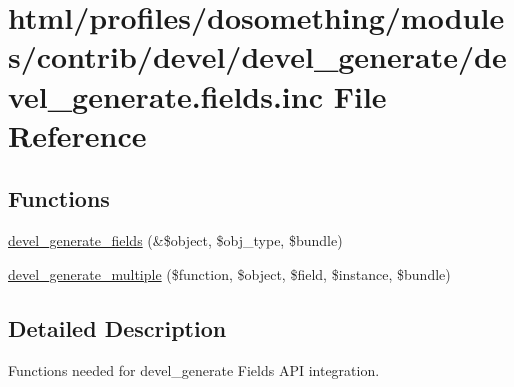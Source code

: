 \hypertarget{devel__generate_8fields_8inc}{
\section{html/profiles/dosomething/modules/contrib/devel/devel\_\-generate/devel\_\-generate.fields.inc File Reference}
\label{devel__generate_8fields_8inc}
}
\subsection*{Functions}
\begin{DoxyCompactItemize}
\item 
\hyperlink{devel__generate_8fields_8inc_ac5b4458ddf3e6b773f24ea286bd67af2}{devel\_\-generate\_\-fields} (\&\$object, \$obj\_\-type, \$bundle)
\item 
\hyperlink{devel__generate_8fields_8inc_ad2eb6952df779dbc62e145d7cc2f86c0}{devel\_\-generate\_\-multiple} (\$function, \$object, \$field, \$instance, \$bundle)
\end{DoxyCompactItemize}


\subsection{Detailed Description}
Functions needed for devel\_\-generate Fields API integration. 

